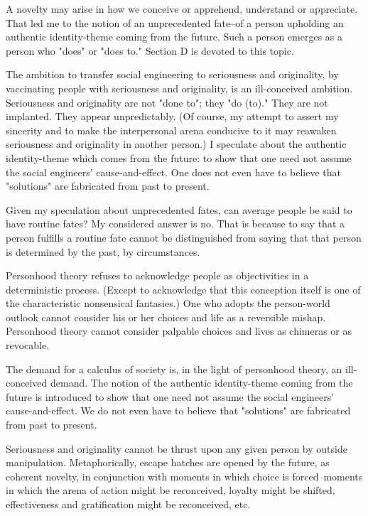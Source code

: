 \begin{enumerate}[label=\alph*.]
A novelty may arise in how we conceive or apprehend, understand or appreciate. That led me to the notion of an unprecedented fate–of a person upholding an authentic identity-theme coming from the future. Such a person emerges as a person who "does" or "does to." Section D is devoted to this topic.

The ambition to transfer social engineering to seriousness and originality, by vaccinating people with seriousness and originality, is an ill-conceived ambition. Seriousness and originality are not "done to"; they "do (to)." They are not implanted. They appear unpredictably. (Of course, my attempt to assert my sincerity and to make the interpersonal arena conducive to it may reawaken seriousness and originality in another person.) I speculate about the authentic identity-theme which comes from the future: to show that one need not assume the social engineers' cause-and-effect. One does not even have to believe that "solutions" are fabricated from past to present.

Given my speculation about unprecedented fates, can average people be said to have routine fates? My considered answer is no. That is because to say that a person fulfills a routine fate cannot be distinguished from saying that that person is determined by the past, by circumstances.

Personhood theory refuses to acknowledge people as objectivities in a deterministic process. (Except to acknowledge that this conception itself is one of the characteristic nonsensical fantasies.) One who adopts the person-world outlook cannot consider his or her choices and life as a reversible mishap. Personhood theory cannot consider palpable choices and lives as chimeras or as revocable.

The demand for a calculus of society is, in the light of personhood theory, an ill-conceived demand. The notion of the authentic identity-theme coming from the future is introduced to show that one need not assume the social engineers' cause-and-effect. We do not even have to believe that "solutions" are fabricated from past to present.

Seriousness and originality cannot be thrust upon any given person by outside manipulation. Metaphorically, escape hatches are opened by the future, as coherent novelty, in conjunction with moments in which choice is forced–moments in which the arena of action might be reconceived, loyalty might be shifted, effectiveness and gratification might be reconceived, etc.


\end{enumerate}
